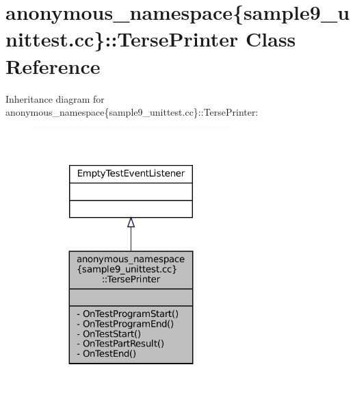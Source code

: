 \hypertarget{classanonymous__namespace_02sample9__unittest_8cc_03_1_1TersePrinter}{}\section{anonymous\+\_\+namespace\{sample9\+\_\+unittest.\+cc\}\+:\+:Terse\+Printer Class Reference}
\label{classanonymous__namespace_02sample9__unittest_8cc_03_1_1TersePrinter}


Inheritance diagram for anonymous\+\_\+namespace\{sample9\+\_\+unittest.\+cc\}\+:\+:Terse\+Printer\+:
\nopagebreak
\begin{figure}[H]
\begin{center}
\leavevmode
\includegraphics[width=215pt]{classanonymous__namespace_02sample9__unittest_8cc_03_1_1TersePrinter__inherit__graph}
\end{center}
\end{figure}


